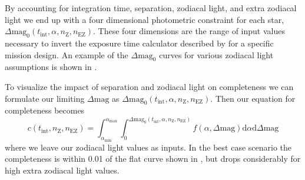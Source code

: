 By accounting for integration time, separation, zodiacal light, and extra
zodiacal light we end up with a four dimensional photometric constraint for
each star, $\Delta\textrm{mag}_0(t_\textrm{int}, \alpha, n_\textrm{Z},
n_\textrm{EZ})$. These four dimensions are the range of input values necessary
to invert the exposure time calculator described by \citet{Nemati2014} for a
specific mission design. An example of the $\Delta\textrm{mag}_0$ curves for
various zodiacal light assumptions is shown in . 


To visualize the impact of separation and zodiacal light on completeness
we can formulate our limiting $\Delta\textrm{mag}$ as 
$\Delta\textrm{mag}_0(t_\textrm{int}, \alpha, n_\textrm{Z}, n_\textrm{EZ})$.
Then our equation for completeness becomes
\begin{equation}
  c(t_\textrm{int}, n_\textrm{Z}, n_\textrm{EZ}) = 
  \int_{\alpha_\textrm{min}}^{\alpha_\textrm{max}} 
  \int_{0}^{\Delta\textrm{mag}_0(t_\textrm{int}, \alpha, n_\textrm{Z}, n_\textrm{EZ})}
  f(\alpha, \Delta\textrm{mag})\textrm{d}\alpha \textrm{d}\Delta\textrm{mag}
  \label{eq:comp_integral}
\end{equation}
where we leave our zodiacal light values as inputs. In the best case scenario
the completeness is within 0.01 of the flat curve shown in
, but drops considerably for high extra zodiacal
light values.

